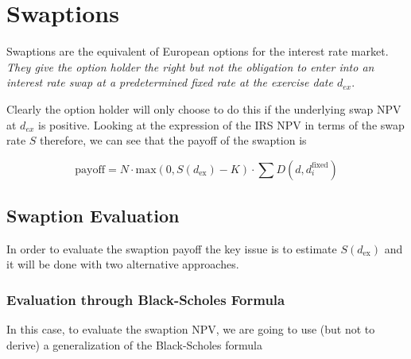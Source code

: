 \section{Swaptions}
\label{interest-rate-swaptions}

Swaptions are the equivalent of European options for the interest rate market. \emph{They give the option holder the right but not the obligation to enter into an interest rate swap at a predetermined fixed rate at the exercise date $d_{ex}$}.

Clearly the option holder will only choose to do this if the underlying swap NPV at $d_{ex}$ is positive. Looking at the expression of the IRS NPV in terms of the swap rate $S$ therefore, we can see that the payoff of the swaption is

\begin{equation}
\mathrm{payoff} = N\cdot \mathrm{max}(0, S(d_{\mathrm{ex}}) - K)\cdot\sum D(d, d_i^{\mathrm{fixed}})
\label{eq:swaption_payoff}
\end{equation}



\subsection{Swaption Evaluation}

In order to evaluate the swaption payoff the key issue is to estimate $S(d_{\mathrm{ex}})$ and it will be done with two alternative approaches.

\subsubsection{Evaluation through Black-Scholes Formula}
\label{evaluation-through-black-scholes-formula}

In this case, to evaluate the swaption NPV, we are going to use (but not to derive) a generalization of the Black-Scholes formula

